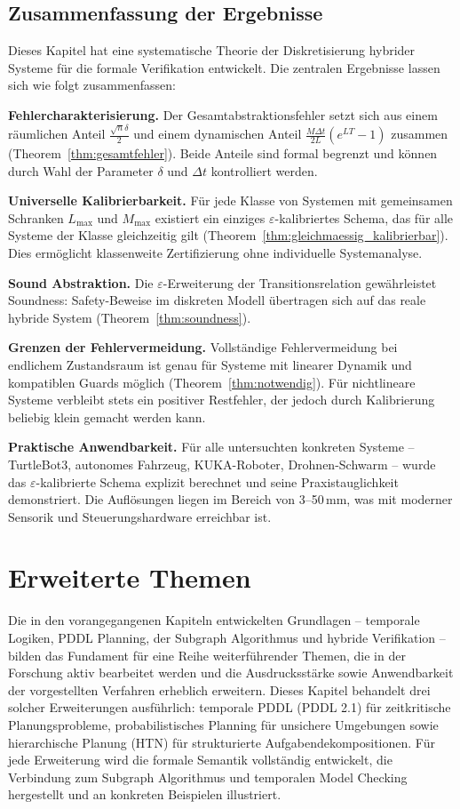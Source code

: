 ﻿\documentclass[a4paper,12pt]{article}
\theoremstyle{definition}
\begin{document}
\subsection{Zusammenfassung der Ergebnisse}

Dieses Kapitel hat eine systematische Theorie der Diskretisierung hybrider Systeme für die formale Verifikation entwickelt. Die zentralen Ergebnisse lassen sich wie folgt zusammenfassen:

\textbf{Fehlercharakterisierung.} Der Gesamtabstraktionsfehler setzt sich aus einem räumlichen Anteil $\frac{\sqrt{n}\delta}{2}$ und einem dynamischen Anteil $\frac{M\Delta t}{2L}(e^{LT}-1)$ zusammen (Theorem~\ref{thm:gesamtfehler}). Beide Anteile sind formal begrenzt und können durch Wahl der Parameter $\delta$ und $\Delta t$ kontrolliert werden.

\textbf{Universelle Kalibrierbarkeit.} Für jede Klasse von Systemen mit gemeinsamen Schranken $L_{\max}$ und $M_{\max}$ existiert ein einziges $\varepsilon$-kalibriertes Schema, das für alle Systeme der Klasse gleichzeitig gilt (Theorem~\ref{thm:gleichmaessig_kalibrierbar}). Dies ermöglicht klassenweite Zertifizierung ohne individuelle Systemanalyse.

\textbf{Sound Abstraktion.} Die $\varepsilon$-Erweiterung der Transitionsrelation gewährleistet Soundness: Safety-Beweise im diskreten Modell übertragen sich auf das reale hybride System (Theorem~\ref{thm:soundness}).

\textbf{Grenzen der Fehlervermeidung.} Vollständige Fehlervermeidung bei endlichem Zustandsraum ist genau für Systeme mit linearer Dynamik und kompatiblen Guards möglich (Theorem~\ref{thm:notwendig}). Für nichtlineare Systeme verbleibt stets ein positiver Restfehler, der jedoch durch Kalibrierung beliebig klein gemacht werden kann.

\textbf{Praktische Anwendbarkeit.} Für alle untersuchten konkreten Systeme -- TurtleBot3, autonomes Fahrzeug, KUKA-Roboter, Drohnen-Schwarm -- wurde das $\varepsilon$-kalibrierte Schema explizit berechnet und seine Praxistauglichkeit demonstriert. Die Auflösungen liegen im Bereich von 3--50\,mm, was mit moderner Sensorik und Steuerungshardware erreichbar ist.


\section{Erweiterte Themen}

Die in den vorangegangenen Kapiteln entwickelten Grundlagen -- temporale Logiken, PDDL Planning, der Subgraph Algorithmus und hybride Verifikation -- bilden das Fundament für eine Reihe weiterführender Themen, die in der Forschung aktiv bearbeitet werden und die Ausdrucksstärke sowie Anwendbarkeit der vorgestellten Verfahren erheblich erweitern. Dieses Kapitel behandelt drei solcher Erweiterungen ausführlich: temporale PDDL (PDDL 2.1) für zeitkritische Planungsprobleme, probabilistisches Planning für unsichere Umgebungen sowie hierarchische Planung (HTN) für strukturierte Aufgabendekompositionen. Für jede Erweiterung wird die formale Semantik vollständig entwickelt, die Verbindung zum Subgraph Algorithmus und temporalen Model Checking hergestellt und an konkreten Beispielen illustriert.
\end{document}
